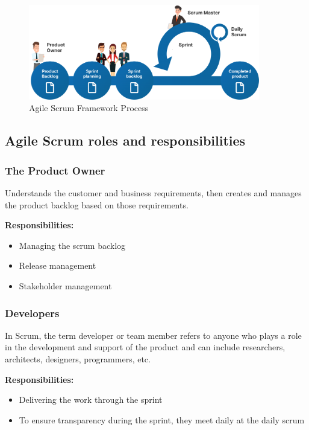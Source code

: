 \begin{figure}[ht!]
    \centering
    \includegraphics[width=0.9\textwidth]{images/agile.png}
    \caption{Agile Scrum Framework Process}
    \label{fig:agile-scrum}
\end{figure}

\subsection{Agile Scrum roles and responsibilities}

\subsubsection{The Product Owner}

Understands the customer and business requirements, then creates and manages the product backlog based on those requirements.

\textbf{Responsibilities:}
\begin{itemize}
    \item Managing the scrum backlog
    \item Release management
    \item Stakeholder management
\end{itemize}

\subsubsection{Developers}

In Scrum, the term developer or team member refers to anyone who plays a role in the development and support of the product and can include researchers, architects, designers, programmers, etc.

\textbf{Responsibilities:}
\begin{itemize}
    \item Delivering the work through the sprint
    \item To ensure transparency during the sprint, they meet daily at the daily scrum
\end{itemize}

